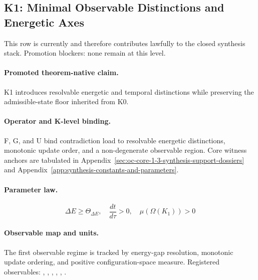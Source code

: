 \subsection{K1: Minimal Observable Distinctions and Energetic Axes}
\label{sec:oc-core-1-3-synthesis-k1}
This row is currently  and therefore contributes lawfully to the closed synthesis stack.
Promotion blockers: none remain at this level.

\paragraph{Promoted theorem-native claim.}
K1 introduces resolvable energetic and temporal distinctions while preserving the admissible-state floor inherited from K0.

\paragraph{Operator and K-level binding.}
F, G, and U bind contradiction load to resolvable energetic distinctions, monotonic update order, and a non-degenerate observable region.
Core witness anchors are tabulated in Appendix~\ref{sec:oc-core-1-3-synthesis-support-dossiers} and Appendix~\ref{app:synthesis-constants-and-parameters}.

\paragraph{Parameter law.}
\[
\Delta E \geq \Theta_{\Delta E},\quad \frac{dt}{d\tau} > 0,\quad \mu(\Omega(K_1)) > 0
\]

\paragraph{Observable map and units.}
The first observable regime is tracked by energy-gap resolution, monotonic update ordering, and positive configuration-space measure.
Registered observables: , \allowbreak {}, \allowbreak {}, \allowbreak {}, \allowbreak {}, \allowbreak {}.

